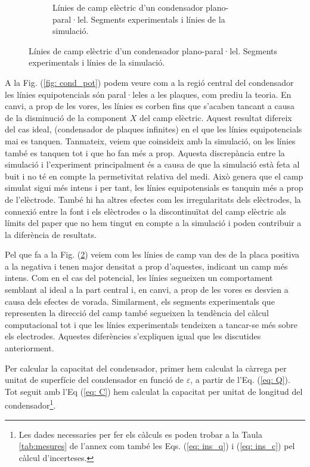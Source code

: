\documentclass[11pt]{article}
\begin{document}
\begin{figure}[h]
\begin{subfigure}{0.495\textwidth}
        \caption{Línies de camp elèctric d'un condensador plano-paral·lel. Segments experimentals i línies de la simulació.}
        \label{fig: cond_e}
    \end{subfigure}
\end{figure}

A la Fig. (\ref{fig: cond_pot}) podem veure com a la regió central del condensador les línies equipotencials són paral·leles a les plaques, com prediu la teoria. En canvi, a prop de les vores, les línies es corben fins que s'acaben tancant a causa de la disminució de la component $X$ del camp elèctric. Aquest resultat difereix del cas ideal, (condensador de plaques infinites) en el que les línies equipotencials mai es tanquen. Tanmateix, veiem que coinsideix amb la simulació, on les línies també es tanquen tot i que ho fan més a prop. Aquesta discrepància entre la simulació i l'experiment principalment és a causa de que la simulació està feta al buit i no té en compte la permetivitat relativa del medi. Això genera que el camp simulat sigui més intens i per tant, les línies equipotensials es tanquin més a prop de l'elèctrode. També hi ha altres efectes com les irregularitats dels elèctrodes, la connexió entre la font i els elèctrodes o la discontinuïtat del camp elèctric als límits del paper que no hem tingut en compte a la simulació i poden contribuir a la diferència de resultats.

Pel que fa a la Fig. (\ref{fig: cond_e}) veiem com les línies de camp van des de la placa positiva a la negativa i tenen major densitat a prop d'aquestes, indicant un camp més intens. Com en el cas del potencial, les línies segueixen un comportament semblant al ideal a la part central i, en canvi, a prop de les vores es desvien a causa dels efectes de vorada. Similarment, els segments experimentals que representen la direcció del camp també segueixen la tendència del càlcul computacional tot i que les línies experimentals tendeixen a tancar-se més sobre els electrodes. Aquestes diferències s'expliquen igual que les discutides anteriorment.

Per calcular la capacitat del condensador, primer hem calculat la càrrega per unitat de superfície del condensador en funció de $\varepsilon$, a partir de l'Eq. (\ref{eq: Q}). Tot seguit amb l'Eq (\ref{eq: C}) hem calculat la capacitat per unitat de longitud del condensador\footnote{Les dades necessaries per fer els càlculs es poden trobar a la Taula \ref{tab:mesures} de l'annex com també les Eqs. (\ref{eq: ins_q}) i (\ref{eq: ins_c}) pel càlcul d'incerteses.}.
\end{document}

